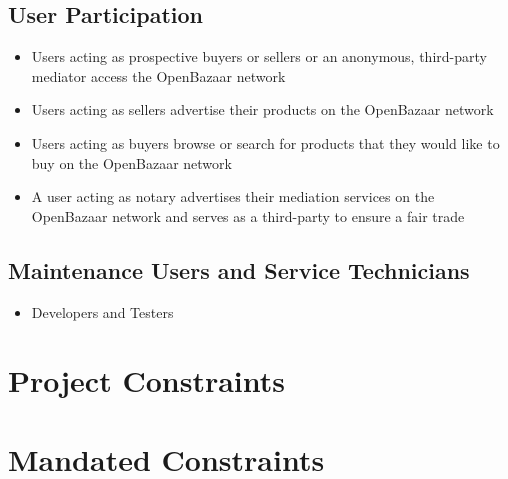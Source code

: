 \documentclass{article}
\begin{document}
\subsection{User Participation}
\begin{itemize}
\item 
Users acting as prospective buyers or sellers or an anonymous, third-party mediator access the OpenBazaar network		

\item
Users acting as sellers advertise their products on the OpenBazaar network

\item
Users acting as buyers browse or search for products that they would like to buy on the OpenBazaar network

\item
A user acting as notary advertises their mediation services on the OpenBazaar network and serves as a third-party to ensure a fair trade
\end{itemize}

\subsection{Maintenance Users and Service Technicians}
\begin{itemize}
\item
Developers and Testers
\end{itemize}

\section*{Project Constraints}

\section{Mandated Constraints}
\end{document}

